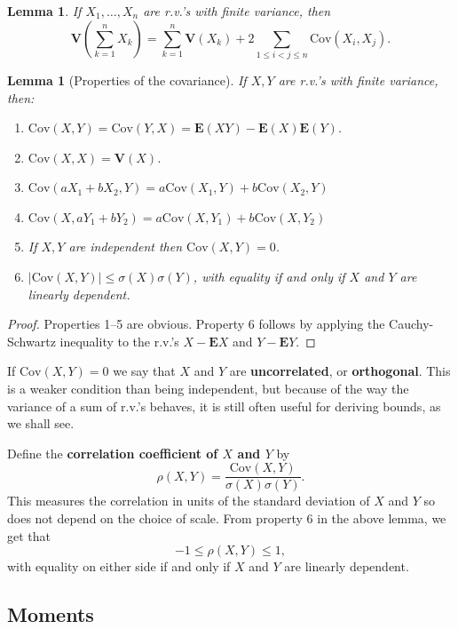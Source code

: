 \documentclass[12pt]{article}
\newtheorem{lem}[thm]{Lemma}
\newcommand{\expec}{\mathbf{E}}
\newcommand{\var}{\mathbf{V}}
\newcommand{\cov}{\textrm{Cov}}
\theoremstyle{example}
\begin{document}
\begin{lem} If $X_1,\ldots,X_n$ are r.v.'s with finite variance, then
$$ \var\left(\sum_{k=1}^n X_k\right) = \sum_{k=1}^n \var(X_k) + 2 \sum_{1\le i<j\le n} \cov(X_i,X_j). $$
\end{lem}

\begin{samepage}
\begin{lem}[Properties of the covariance] If $X,Y$ are r.v.'s with finite variance, then: \\

\vspace{-20.0pt}
\begin{enumerate}
\item $\cov(X,Y)=\cov(Y,X) = \expec(XY) - \expec(X) \expec(Y)$.
\item $\cov(X,X) = \var(X)$.
\item $\cov(aX_1+bX_2,Y) = a\cov(X_1,Y)+b\cov(X_2,Y)$
\item $\cov(X,aY_1+bY_2) = a\cov(X,Y_1)+b\cov(X,Y_2)$
\item If $X,Y$ are independent then $\cov(X,Y)=0$.
\item $|\cov(X,Y)| \le \sigma(X) \sigma(Y)$, with equality if and only if $X$ and $Y$ are linearly dependent.
\end{enumerate}
\end{lem}
\end{samepage}

\begin{proof} Properties 1--5 are obvious. Property 6 follows by applying the Cauchy-Schwartz inequality to the r.v.'s $X-\expec X$ and $Y-\expec Y$.
\end{proof}

If $\cov(X,Y)=0$ we say that $X$ and $Y$ are \textbf{uncorrelated}, or \textbf{orthogonal}. This is a weaker condition than being independent, but because of the way the variance of a sum of r.v.'s behaves, it is still often useful for deriving bounds, as we shall see.

Define the \textbf{correlation coefficient of $X$ and $Y$} by
$$ \rho(X,Y) = \frac{\cov(X,Y)}{\sigma(X)\sigma(Y)}. $$
This measures the correlation in units of the standard deviation of $X$ and $Y$ so does not depend on the choice of scale. From property 6 in the above lemma, we get that $$-1\le \rho(X,Y)\le 1,$$ with equality on either side if and only if $X$ and $Y$ are linearly dependent.


\subsection{Moments}
\end{document}
